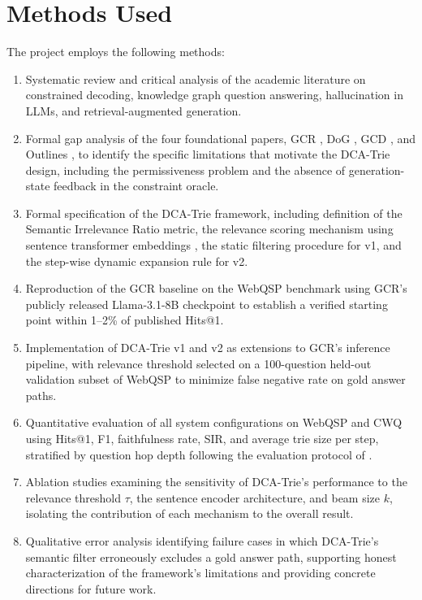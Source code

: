 \section{Methods Used}

The project employs the following methods:

\begin{enumerate}[label=\roman*.]
  \item Systematic review and critical analysis of the academic literature on constrained decoding, knowledge graph question answering, hallucination in LLMs, and retrieval-augmented generation.
  \item Formal gap analysis of the four foundational papers, GCR \citep{luo2025-graph-constrained-reasoning}, DoG \citep{li2024-decoding-on-graphs}, GCD \citep{geng2023grammarconstrained}, and Outlines \citep{willard2023outlines}, to identify the specific limitations that motivate the DCA-Trie design, including the permissiveness problem and the absence of generation-state feedback in the constraint oracle.
  \item Formal specification of the DCA-Trie framework, including definition of the Semantic Irrelevance Ratio metric, the relevance scoring mechanism using sentence transformer embeddings \citep{reimers2019sbert}, the static filtering procedure for v1, and the step-wise dynamic expansion rule for v2.
  \item Reproduction of the GCR baseline on the WebQSP benchmark using GCR's publicly released Llama-3.1-8B checkpoint to establish a verified starting point within 1--2\% of published Hits@1.
  \item Implementation of DCA-Trie v1 and v2 as extensions to GCR's inference pipeline, with relevance threshold selected on a 100-question held-out validation subset of WebQSP to minimize false negative rate on gold answer paths.
  \item Quantitative evaluation of all system configurations on WebQSP and CWQ using Hits@1, F1, faithfulness rate, SIR, and average trie size per step, stratified by question hop depth following the evaluation protocol of \citet{lan2022survey}.
  \item Ablation studies examining the sensitivity of DCA-Trie's performance to the relevance threshold $\tau$, the sentence encoder architecture, and beam size $k$, isolating the contribution of each mechanism to the overall result.
  \item Qualitative error analysis identifying failure cases in which DCA-Trie's semantic filter erroneously excludes a gold answer path, supporting honest characterization of the framework's limitations and providing concrete directions for future work.
\end{enumerate}

